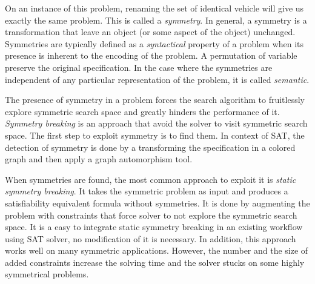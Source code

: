 On an instance of this problem, renaming the set of identical vehicle will give us exactly the same problem.
This is called a \textit{symmetry}. In general, a symmetry is a transformation that leave an object (or some aspect of the object) unchanged. Symmetries are typically defined as a \textit{syntactical} property of a problem when its presence is inherent to the encoding of the problem. A permutation of variable preserve the original specification. In the case where the symmetries are independent of any 
particular representation of the problem, it is called \textit{semantic}.


The presence of symmetry in a problem forces the search algorithm to fruitlessly explore symmetric
search space and greatly hinders the performance of it. \textit{Symmetry breaking} is an approach that
avoid the solver to visit symmetric search space. The first step to exploit symmetry is to find them.
In context of SAT, the detection of symmetry is done by a transforming the specification
in a colored graph and then apply a graph automorphism tool.





%
%
%
%
%
%
%
%
%



When symmetries are found, the most common approach to exploit it is \emph{static symmetry breaking}.
It takes the symmetric problem as input and produces a satisfiability equivalent formula without symmetries.
It is done by augmenting the problem with constraints that force solver to not explore the symmetric search 
space. It is a easy to integrate static symmetry breaking in an existing workflow using SAT solver, no modification of it is necessary. In addition, this approach works well on many symmetric applications.
However, the number and the size of added constraints increase the solving time and the solver stucks
on some highly symmetrical problems.

